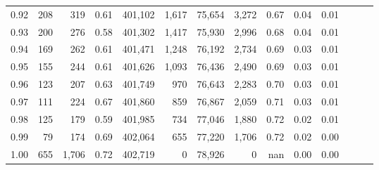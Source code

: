 \begin{tabular}{rrrrrrrrrrrrrr}
0.92 &    208 &    319 &  0.61 &  401,102 &    1,617 &  75,654 &   3,272 &  0.67 &  0.04 &      0.01 \\
0.93 &    200 &    276 &  0.58 &  401,302 &    1,417 &  75,930 &   2,996 &  0.68 &  0.04 &      0.01 \\
0.94 &    169 &    262 &  0.61 &  401,471 &    1,248 &  76,192 &   2,734 &  0.69 &  0.03 &      0.01 \\
0.95 &    155 &    244 &  0.61 &  401,626 &    1,093 &  76,436 &   2,490 &  0.69 &  0.03 &      0.01 \\
0.96 &    123 &    207 &  0.63 &  401,749 &      970 &  76,643 &   2,283 &  0.70 &  0.03 &      0.01 \\
0.97 &    111 &    224 &  0.67 &  401,860 &      859 &  76,867 &   2,059 &  0.71 &  0.03 &      0.01 \\
0.98 &    125 &    179 &  0.59 &  401,985 &      734 &  77,046 &   1,880 &  0.72 &  0.02 &      0.01 \\
0.99 &     79 &    174 &  0.69 &  402,064 &      655 &  77,220 &   1,706 &  0.72 &  0.02 &      0.00 \\
1.00 &    655 &  1,706 &  0.72 &  402,719 &        0 &  78,926 &       0 &   nan &  0.00 &      0.00 \\
\bottomrule
\end{tabular}
